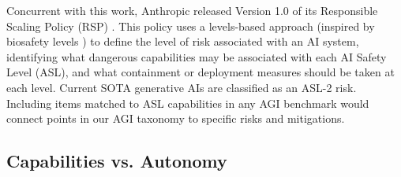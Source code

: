 \documentclass{article}
\theoremstyle{plain}
\theoremstyle{definition}
\theoremstyle{remark}
\begin{document}
Concurrent with this work, Anthropic released Version 1.0 of its Responsible Scaling Policy (RSP) \citep{rsp}. This policy uses a levels-based approach (inspired by biosafety levels \citep{richmond2009biosafety}) to define the level of risk associated with an AI system, identifying what dangerous capabilities may be associated with each AI Safety Level (ASL), and what containment or deployment measures should be taken at each level. Current SOTA generative AIs are classified as an ASL-2 risk. Including items matched to ASL capabilities in any AGI benchmark would connect points in our AGI taxonomy to specific risks and mitigations.

\subsection{Capabilities vs. Autonomy}
\label{autonomy}
\end{document}
